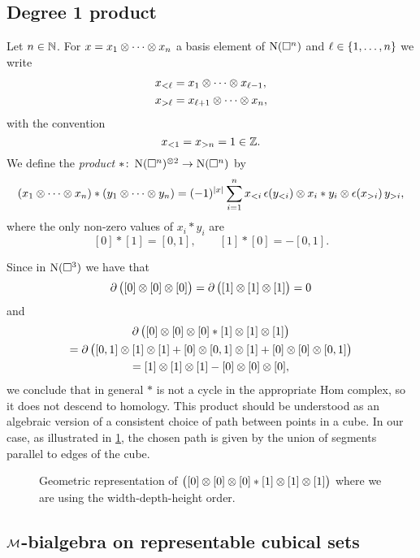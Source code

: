 \subsection{Degree 1 product}

Let $n \in \mathbb{N}$.
For $x = x_1 \otimes \dotsb \otimes x_n$ a basis element of $\operatorname{N}(\square^n)$ and $\ell \in \{1,\dots,n\}$ we write
\begin{align*}
	x_{<\ell} & = x_1 \otimes \dotsb \otimes x_{\ell-1}, \\
	x_{>\ell} & = x_{\ell+1} \otimes \dotsb \otimes x_n,
\end{align*}
with the convention
\[
x_{<1} = x_{>n} = 1 \in \mathbb{Z}.
\]
We define the \textit{product} $\ast \colon \operatorname{N}(\square^n)^{\otimes 2} \to \operatorname{N}(\square^n)$ by
\begin{multline*}
(x_1 \otimes \dotsb \otimes x_n) \ast (y_1 \otimes \dotsb \otimes y_n)
=
(-1)^{|x|} \sum_{i=1}^n x_{<i}\, \epsilon(y_{<i}) \otimes x_i \ast y_i \otimes \epsilon(x_{>i}) \, y_{>i},
\end{multline*}
where the only non-zero values of $x_i \ast y_i$ are
\[
[0] \ast [1] = [0, 1], \qquad [1] \ast [0] = -[0, 1].
\]

\begin{example*}
	Since in $\operatorname{N}(\square^3)$ we have that
	\[
	\operatorname{\partial} \big([0]\otimes[0]\otimes[0]\big) = \operatorname{\partial} \big([1]\otimes[1]\otimes[1]\big) = 0
	\]
	and
	\begin{multline*}
		\operatorname{\partial}\big([0]\otimes[0]\otimes[0] \ast [1]\otimes[1]\otimes[1]\big) \\ =
		\operatorname{\partial}\big([0,1]\otimes[1]\otimes[1] + [0]\otimes[0,1]\otimes[1] + [0]\otimes[0]\otimes[0,1] \big) \\ =
		[1]\otimes[1]\otimes[1] - [0]\otimes[0]\otimes[0],
	\end{multline*}
	we conclude that in general $\ast$ is not a cycle in the appropriate Hom complex, so it does not descend to homology.
	This product should be understood as an algebraic version of a consistent choice of path between points in a cube.
	In our case, as illustrated in \cref{f:product}, the chosen path is given by the union of segments parallel to edges of the cube.
\end{example*}

\begin{figure}[h!]
	\centering
	
	\caption{Geometric representation of $\big([0]\otimes[0]\otimes[0] \ast [1]\otimes[1]\otimes[1]\big)$ where we are using the width-depth-height order.}
	\label{f:product}
\end{figure}

\subsection{$\mathcal{M}$-bialgebra on representable cubical sets}


